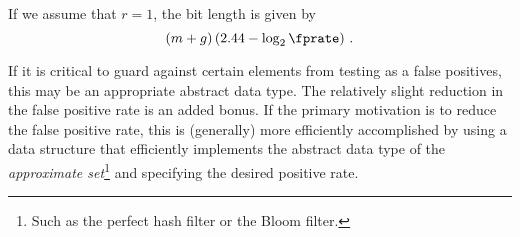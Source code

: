 \documentclass[ ../main.tex]{subfiles}
\begin{document}
If we assume that  $r = 1$, the bit length is given by
\begin{equation}
    (m + g) \left(2.44 - \log_2 \fprate\right)\,.
\end{equation}


\begin{remark}
If it is critical to guard against certain elements from testing as a false positives, this may be an appropriate abstract data type. The relatively slight reduction in the false positive rate is an added bonus. If the primary motivation is to reduce the false positive rate, this is (generally) more efficiently accomplished by using a data structure that efficiently implements the abstract data type of the \emph{approximate set}\footnote{Such as the perfect hash filter or the Bloom filter.} and specifying the desired positive rate.
\end{remark}
\end{document}
